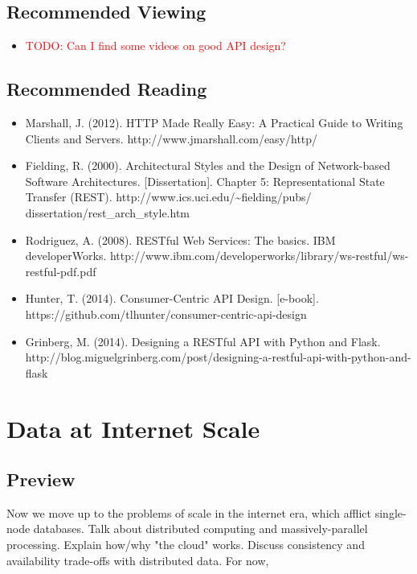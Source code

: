 \documentclass[11pt]{book}
\newcommand{\todo}[1]{\textcolor{red}{TODO: #1}} %
\begin{document}
\section*{Recommended Viewing}
\begin{itemize}
    \item \todo{Can I find some videos on good API design?}
\end{itemize}

\section*{Recommended Reading}
\begin{itemize}
    \item Marshall, J. (2012).  HTTP Made Really Easy: A Practical Guide to Writing Clients and Servers.  http://www.jmarshall.com/easy/http/
    \item Fielding, R. (2000). Architectural Styles and the Design of Network-based Software Architectures. [Dissertation]. Chapter 5: Representational State Transfer (REST). http://www.ics.uci.edu/\~{}fielding/pubs/ dissertation/rest\_arch\_style.htm
    \item Rodriguez, A. (2008). RESTful Web Services: The basics.  IBM developerWorks. http://www.ibm.com/developerworks/library/ws-restful/ws-restful-pdf.pdf
    \item Hunter, T. (2014). Consumer-Centric API Design. [e-book]. \\https://github.com/tlhunter/consumer-centric-api-design
    \item Grinberg, M. (2014). Designing a RESTful API with Python and Flask. http://blog.miguelgrinberg.com/post/designing-a-restful-api-with-python-and-flask
\end{itemize}









\chapter{Data at Internet Scale}\label{ch:cloud}

\section*{Preview}

Now we move up to the problems of scale in the internet era, which afflict single-node databases.  Talk about distributed computing and massively-parallel processing.  Explain how/why "the cloud" works.  Discuss consistency and availability trade-offs with distributed data.  For now, 
\end{document}

